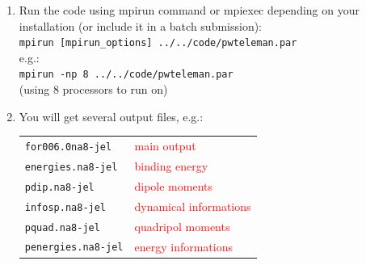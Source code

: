 \documentclass[10pt]{beamer}
\begin{document}
\begin{frame}
\frametitle{ }
\begin{enumerate}  
\item  Run the code using mpirun command or mpiexec depending on your installation (or include it in a batch submission):\\
\vspace*{0.2cm}
{\tt mpirun [mpirun\_options] ../../code/pwteleman.par}\\
\vspace*{0.2cm}
e.g.:\\
\vspace*{0.2cm}
{\tt mpirun -np 8 ../../code/pwteleman.par}\\
\vspace*{0.2cm}
(using 8 processors to run on)
\vspace*{0.4cm}
\item You will get several output files, e.g.:\\
\vspace*{0.2cm}
\begin{tabular}{ll}
\vspace*{0.1cm}
{\tt for006.0na8-jel} & {\small{\textcolor{red}{main output}}}\\
\vspace*{0.1cm}
{\tt energies.na8-jel} &{\small{\textcolor{red}{binding energy}}}\\
\vspace*{0.1cm}
{\tt pdip.na8-jel}& {\small{\textcolor{red}{dipole moments}}}\\
\vspace*{0.1cm}
{\tt infosp.na8-jel} & {\small{\textcolor{red}{dynamical informations}}}\\
\vspace*{0.1cm}
{\tt pquad.na8-jel} & {\small{\textcolor{red}{quadripol moments}}}\\
\vspace*{0.1cm}
{\tt penergies.na8-jel} & {\small{\textcolor{red}{energy informations}}}\\
\end{tabular}
\end{enumerate} 
 

   
\end{frame}

\end{document}
